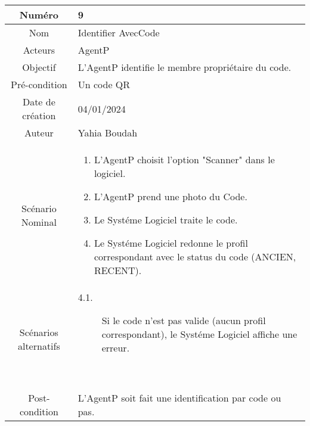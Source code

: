 

\begin{tabular}{ |c|p{12cm}| }
    \hline
    Numéro & 9 \\
    \hline
    Nom & Identifier AvecCode \\
    \hline
    Acteurs & AgentP \\ 
    \hline
    Objectif & L'AgentP identifie le membre propriétaire du code. \\ 
    \hline
    Pré-condition & Un code QR \\
    \hline
    Date de création & 04/01/2024 \\
    \hline
    Auteur & Yahia Boudah \\
    \hline
    Scénario Nominal & \begin{enumerate}
        \item L'AgentP choisit l'option "Scanner" dans le logiciel.
        \item L'AgentP prend une photo du Code.
        \item Le Systéme Logiciel traite le code.
        \item Le Systéme Logiciel redonne le profil correspondant avec le status du code (ANCIEN, RECENT).
    \end{enumerate} \\
    \hline
    Scénarios alternatifs & \begin{description}
        \item[4.1.] Si le code n'est pas valide (aucun profil correspondant), le Systéme Logiciel affiche une erreur.
    \end{description} \\
    \hline
    Post-condition & L'AgentP soit fait une identification par code ou pas. \\
    \hline
\end{tabular}